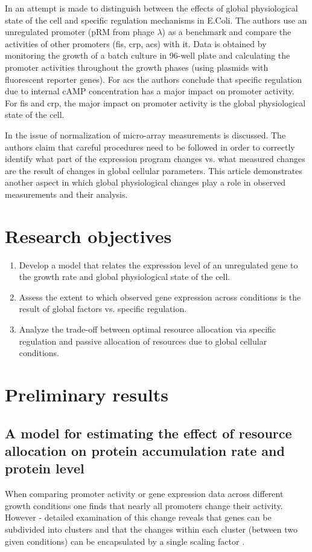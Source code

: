 \documentclass[a4page]{report}
\begin{document}
In \cite{Berthoumieux2013} an attempt is made to distinguish between the effects of global physiological state of the cell and specific regulation mechanisms in E.Coli.
The authors use an unregulated promoter (pRM from phage $\lambda$) as a benchmark and compare the activities of other promoters (fis, crp, acs) with it.
Data is obtained by monitoring the growth of a batch culture in 96-well plate and calculating the promoter activities throughout the growth phases (using plasmids with fluorescent reporter genes).
For acs the authors conclude that specific regulation due to internal cAMP concentration has a major impact on promoter activity.
For fis and crp, the major impact on promoter activity is the global physiological state of the cell.

In \cite{loven2012} the issue of normalization of micro-array measurements is discussed.
The authors claim that careful procedures need to be followed in order to correctly identify what part of the expression program changes vs. what measured changes are the result of changes in global cellular parameters.
This article demonstrates another aspect in which global physiological changes play a role in observed measurements and their analysis.

\section{Research objectives}
\begin{enumerate}
\item Develop a model that relates the expression level of an unregulated gene to the growth rate and global physiological state of the cell.
\item Assess the extent to which observed gene expression across conditions is the result of global factors vs. specific regulation.
\item Analyze the trade-off between optimal resource allocation via specific regulation and passive allocation of resources due to global cellular conditions.
\end{enumerate}
\section{Preliminary results}
\subsection{A model for estimating the effect of resource allocation on protein accumulation rate and protein level}
When comparing promoter activity or gene expression data across different growth conditions one finds that nearly all promoters change their activity.
However - detailed examination of this change reveals that genes can be subdivided into clusters and that the changes within each cluster (between two given conditions) can be encapsulated by a single scaling factor \cite{Leeat2013}.
\end{document}
